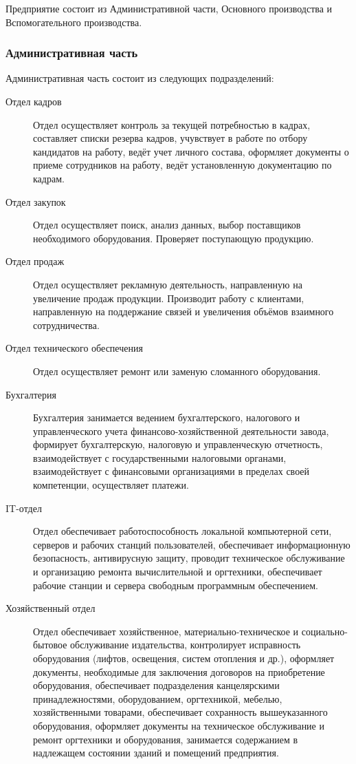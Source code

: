 Предприятие состоит из Административной части, Основного производства и Вспомогательного производства.

\subsubsection{Административная часть}
Административная часть состоит из следующих подразделений:
\begin{description}
\item [Отдел кадров]
  Отдел осуществляет контроль за текущей потребностью в кадрах, составляет списки резерва кадров, учувствует в работе по отбору кандидатов на работу, ведёт учет личного состава, оформляет документы о приеме сотрудников на работу, ведёт установленную документацию по кадрам.
\item [Отдел закупок]
  Отдел осуществляет поиск, анализ данных, выбор поставщиков необходимого оборудования. Проверяет поступающую продукцию.
\item [Отдел продаж]
  Отдел осуществляет рекламную деятельность, направленную на увеличение продаж продукции. Производит работу с клиентами, направленную на поддержание связей и увеличения объёмов взаимного сотрудничества.
\item [Отдел технического обеспечения]
  Отдел осуществляет ремонт или заменую сломанного оборудования.
\item [Бухгалтерия]
  Бухгалтерия занимается ведением бухгалтерского, налогового и управленческого учета финансово-хозяйственной деятельности завода, формирует бухгалтерскую, налоговую и управленческую отчетность, взаимодействует с государственными налоговыми органами, взаимодействует с финансовыми организациями в пределах своей компетенции, осуществляет платежи.
\item [IT-отдел]
  Отдел обеспечивает работоспособность локальной компьютерной сети, серверов и рабочих станций пользователей, обеспечивает информационную безопасность, антивирусную защиту, проводит техническое обслуживание и организацию ремонта вычислительной и оргтехники, обеспечивает рабочие станции и сервера свободным программным обеспечением.
\item [Хозяйственный отдел]
  Отдел обеспечивает хозяйственное, материально-техническое и социально-бытовое обслуживание издательства, контролирует исправность оборудования (лифтов, освещения, систем отопления и др.), оформляет документы, необходимые для заключения договоров на приобретение оборудования, обеспечивает подразделения канцелярскими принадлежностями, оборудованием, оргтехникой, мебелью, хозяйственными товарами, обеспечивает сохранность вышеуказанного оборудования, оформляет документы на техническое обслуживание и ремонт оргтехники и оборудования, занимается содержанием в надлежащем состоянии зданий и помещений предприятия.
\end{description}

